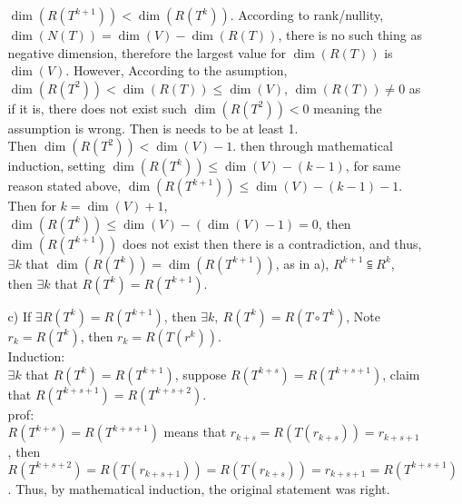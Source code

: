 \documentclass{article}
\begin{document}
\begin{itemize}
\begin{itemize}
        \(\dim(R(T^{k+1}))<\dim(R(T^{k}))\). According to rank/nullity, \(\dim(N(T)) = \dim(V)-\dim(R(T))\), there is no such thing as negative dimension, therefore the largest value for \(\dim(R(T))\) is \(\dim(V)\). However, According to the asumption,
        \(\dim(R(T^{2}))<\dim(R(T))\leq \dim(V)\), \(\dim(R(T))\neq 0 \) as if it is, there does not exist such \(\dim(R(T^2))<0\) meaning the assumption is wrong. Then is needs to be at least 1.
        \\Then \(\dim(R(T^2))<\dim(V)-1\). then through mathematical induction, setting \(\dim(R(T^k))\leq\dim(V)-(k-1)\), for same reason stated above, 
        \(\dim(R(T^{k+1}))\leq\dim(V)-(k-1)-1\). Then for \(k = \dim(V)+1\), \(\dim(R(T^{k}))\leq \dim(V)-(\dim(V)-1) = 0\), then \(\dim(R(T^{k+1}))\) does not exist then there is a contradiction, and thus, \(\exists k \) that \(\dim(R(T^k))=\dim(R(T^{k+1}))\), as in a), 
        \(R^{k+1}\subseteqq R^k\), then \(\exists k\) that \(R(T^{k}) = R(T^{k+1})\).
        \item [c)] If \(\exists R(T^{k}) = R(T^{k+1})\), then \(\exists k,\ R(T^k) = R(T\circ T^k)\), Note \(r_k = R(T^k)\), then \(r_k = R(T(r^k))\).
        \\Induction:\\
        \(\exists k\) that \(R(T^k)=R(T^{k+1})\), suppose \(R(T^{k+s}) =R(T^{k+s+1})\), claim that \(R(T^{k+s+1}) =R(T^{k+s+2})\).
        \\prof:\\
        \(R(T^{k+s}) =R(T^{k+s+1})\) means that \(r_{k+s} = R(T(r_{k+s})) = r_{k+s+1}\), then
        \(R(T^{k+s+2}) = R(T(r_{k+s+1})) = R(T(r_{k+s})) = r_{k+s+1} = R(T^{k+s+1})\).
        Thus, by mathematical induction, the original statement was right.
    \end{itemize}
\end{itemize}
\end{document}
